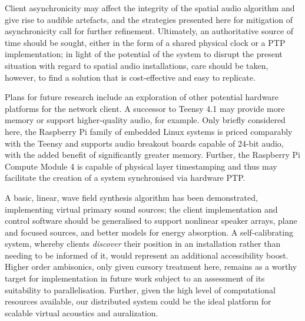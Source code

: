 \documentclass[utf8]{FrontiersinHarvard}
\begin{document}
    Client asynchronicity may affect the integrity of the spatial audio
    algorithm and give rise to audible artefacts, and the strategies presented
    here for mitigation of asynchronicity call for further refinement.
    Ultimately, an authoritative source of time should be sought, either in the
    form of a shared physical clock or a PTP implementation;
    in light of the potential of the system to disrupt the present situation
    with regard to spatial audio installations, care should be taken, however,
    to find a solution that is cost-effective and easy to replicate.


    Plans for future research include an exploration of other potential hardware
    platforms for the network client.
    A successor to Teensy 4.1 may provide more memory or support higher-quality
    audio, for example.
    Only briefly considered here, the Raspberry Pi family of embedded Linux
    systems is priced comparably with the Teensy and supports audio breakout
    boards capable of 24-bit audio, with the added benefit of significantly
    greater memory.
    Further, the Raspberry Pi Compute Module 4 is capable of physical layer
    timestamping and thus may facilitate the creation of a system synchronised
    via hardware PTP\@.

    A basic, linear, wave field synthesis algorithm has been demonstrated,
    implementing virtual primary sound sources;
    the client implementation and control software should be generalised to
    support nonlinear speaker arrays, plane and focused sources, and better
    models for energy absorption.
    A self-calibrating system, whereby clients \textit{discover} their position
    in an installation rather than needing to be informed of it, would represent
    an additional accessibility boost.
    Higher order ambisonics, only given cursory treatment here, remains as a
    worthy target for implementation in future work subject to an assessment of
    its suitability to parallelisation.
    Further, given the high level of computational resources available, our
    distributed system could be the ideal platform for scalable virtual
    acoustics and auralization.

    
    
\end{document}
